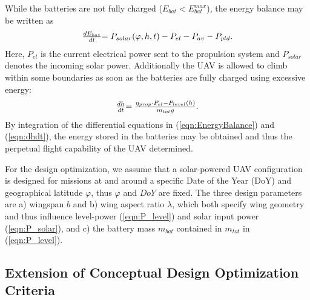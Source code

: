 While the batteries are not fully charged ($E_{bat} < E_{bat}^{max}$), the energy balance may be written as
\begin{equation}\label{eqn:EnergyBalance}
\begin{array}{r@{}l}
\frac{dE_{bat}}{dt}&=P_{solar}(\varphi,h,t)-P_{el}-P_{av}-P_{pld} .
\end{array}
\end{equation}
Here, $P_{el}$ is the current electrical power sent to the propulsion system and $P_{solar}$ denotes the incoming solar power. Additionally the UAV is allowed to climb within some boundaries as soon as the batteries are fully charged using excessive energy:\\
\begin{equation}\label{eqn:dhdt}
\begin{array}{r@{}l}
\frac{dh}{dt}&=\frac{\eta_{prop}\cdot P_{el}-P_{level}(h)}{m_{tot}g} .
\end{array}
\end{equation}
By integration of the differential equations in (\ref{eqn:EnergyBalance}) and (\ref{eqn:dhdt}), the energy stored in the batteries may be obtained and thus the perpetual flight capability of the UAV determined.

For the design optimization, we assume that a solar-powered UAV configuration is designed for missions at and around a specific Date of the Year (DoY) and geographical latitude $\varphi$, thus $\varphi$ and $DoY$ are fixed. The three design parameters are a) wingspan $b$ and b) wing aspect ratio $\lambda$, which both specify wing geometry and thus influence level-power (\ref{eqn:P_level}) and solar input power (\ref{eqn:P_solar}), and c) the battery mass $m_{bat}$ contained in $m_{tot}$ in (\ref{eqn:P_level}).

\subsection{Extension of Conceptual Design Optimization Criteria}

